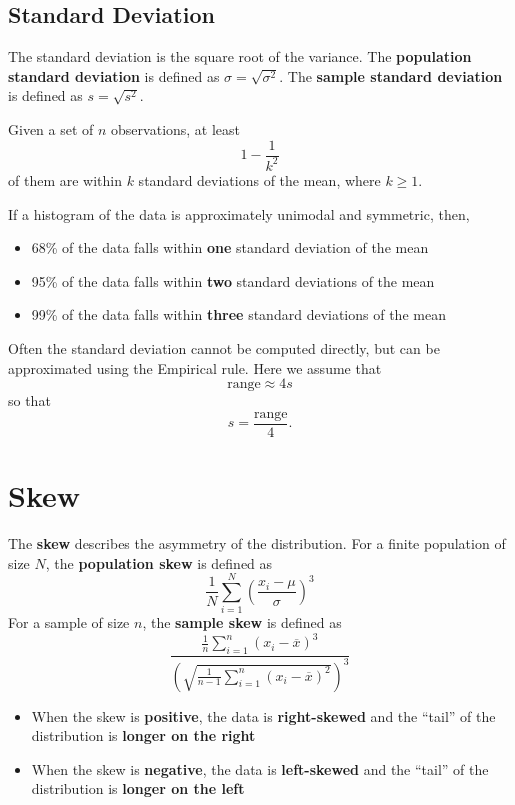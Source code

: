 \documentclass{article}
\begin{document}
\begin{multicols}{3}
\subsection{Standard Deviation}
The standard deviation is the square root of the variance.
The \textbf{population standard deviation} is defined as
\(
              \sigma = \sqrt{\sigma^2}.
              \)
The \textbf{sample standard deviation} is defined as
\(
              s = \sqrt{s^2}.
              \)
\begin{theorem}
    Given a set of \(n\) observations, at least
    \begin{equation*}
        1 - \frac{1}{k^2}
    \end{equation*}
    of them are within \(k\) standard deviations of the mean,
    where \(k \geq 1\).
\end{theorem}
\begin{theorem}
    If a histogram of the data is approximately unimodal and symmetric, then,
    \begin{itemize}
        \item 68\% of the data falls within \textbf{one} standard deviation of the mean
        \item 95\% of the data falls within \textbf{two} standard deviations of the mean
        \item 99\% of the data falls within \textbf{three} standard deviations of the mean
    \end{itemize}
\end{theorem}
Often the standard deviation cannot be computed directly, but can be approximated
using the Empirical rule. Here we assume that
\begin{equation*}
    \text{range} \approx 4 s
\end{equation*}
so that
\begin{equation*}
    s = \frac{\text{range}}{4}.
\end{equation*}
\section{Skew}
The \textbf{skew} describes the asymmetry of the distribution.
For a finite population of size \(N\), the \textbf{population skew} is defined as
\begin{equation*}
    \frac{1}{N} \sum_{i = 1}^N \left( \frac{x_i - \mu}{\sigma} \right)^3
\end{equation*}
For a sample of size \(n\), the \textbf{sample skew} is defined as
\begin{equation*}
    \frac{\frac{1}{n} \sum_{i = 1}^n \left( x_i - \overline{x} \right)^3}{\left( \sqrt{\frac{1}{n - 1} \sum_{i = 1}^n \left( x_i - \overline{x} \right)^2} \right)^3}
\end{equation*}
\begin{itemize}
    \item When the skew is \textbf{positive}, the data is \textbf{right-skewed} and the ``tail'' of the distribution is \textbf{longer on the right}
    \item When the skew is \textbf{negative}, the data is \textbf{left-skewed} and the ``tail'' of the distribution is \textbf{longer on the left}
\end{itemize}

\end{multicols}
\end{document}
